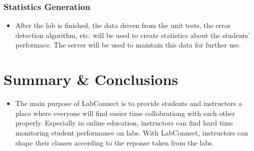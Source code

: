 \documentclass[a4paper, 12pt]{article}
\begin{document}
    \subsubsection{Statistics Generation}

    \begin{itemize}
      \item After the lab is finished, the data driven from the unit tests, the error detection algorithm, etc. will be used
      to create statistics about the students' performace. The server will be used to maintain this data for further use.
    \end{itemize}

    \section{Summary \& Conclusions}

    \begin{itemize}
      \item The main purpose of LabConnect is to provide students and instructors a place where everyone will find easier time
      collobrationg with each other properly. Especially in online education, instructors can find hard time monitoring student
      performance on labs. With LabConnect, instructors can shape their classes according to the reponse taken from the labs.
    \end{itemize}

    \printbibliography
\end{document}
